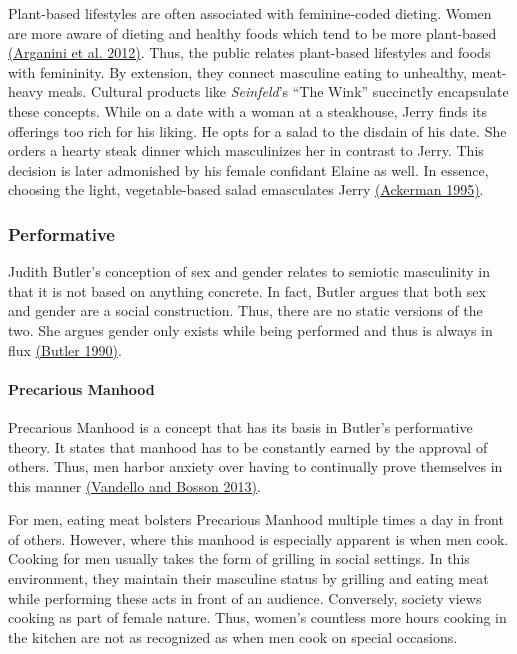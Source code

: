 \documentclass[twoside]{report}
\begin{document}
Plant-based lifestyles are often associated with feminine-coded dieting. Women are more aware of dieting and healthy foods which tend to be more plant-based \hyperlink{arganini}{(Arganini et al. 2012)}. Thus, the public relates plant-based lifestyles and foods with femininity. By extension, they connect masculine eating to unhealthy, meat-heavy meals. Cultural products like \emph{Seinfeld}'s ``The Wink'' succinctly encapsulate these concepts. While on a date with a woman at a steakhouse, Jerry finds its offerings too rich for his liking. He opts for a salad to the disdain of his date. She orders a hearty steak dinner which masculinizes her in contrast to Jerry. This decision is later admonished by his female confidant Elaine as well. In essence, choosing the light, vegetable-based salad emasculates Jerry \hyperlink{ackerman}{(Ackerman 1995)}.

\subsubsection{Performative}

Judith Butler's conception of sex and gender relates to semiotic masculinity in that it is not based on anything concrete. In fact, Butler argues that both sex and gender are a social construction. Thus, there are no static versions of the two. She argues gender only exists while being performed and thus is always in flux \hyperlink{butler}{(Butler 1990)}.

\paragraph{Precarious Manhood}

Precarious Manhood is a concept that has its basis in Butler's performative theory. It states that manhood has to be constantly earned by the approval of others. Thus, men harbor anxiety over having to continually prove themselves in this manner \hyperlink{vandello}{(Vandello and Bosson 2013)}.

For men, eating meat bolsters Precarious Manhood multiple times a day in front of others. However, where this manhood is especially apparent is when men cook. Cooking for men usually takes the form of grilling in social settings. In this environment, they maintain their masculine status by grilling and eating meat while performing these acts in front of an audience. Conversely, society views cooking as part of female nature. Thus, women's countless more hours cooking in the kitchen are not as recognized as when men cook on special occasions.
\end{document}
